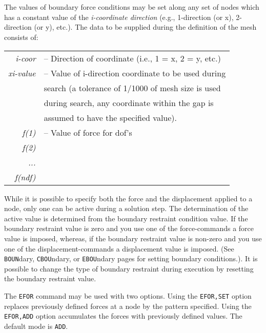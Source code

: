  \\{\smallskip}
 \\{\smallskip}
\headb

The values of boundary force conditions may be set
along any set of nodes which has a constant value of the
{\it i-coordinate direction} (e.g., 1-direction (or x), 2-direction
(or y), etc.).  The data to be supplied during the
definition of the mesh consists of:

\begin{center}
\begin{tabular}{r l}
\it i-coor   &-- Direction of coordinate (i.e., 1 = x, 2 = y, etc.) \\
\it xi-value &-- Value of i-direction coordinate to be used during  \\
             &\quad search (a tolerance of 1/1000 of mesh size is used  \\
             &\quad during search, any coordinate within the gap is  \\
             &\quad assumed to have the specified value).  \\
\it f(1)     &-- Value of force for dof's   \\
\it f(2)     &   \\
\it ...      &   \\
\it f(ndf)   &   \\
\end{tabular}
\end{center}
While it is possible to specify both the force and the displacement applied
to a node, only one can be active during a solution step.  The determination
of the active value is determined from the boundary
restraint condition value.  If the boundary restraint value is zero
and you use one of the force-commands a force
value is imposed, whereas, if the boundary restraint value is non-zero
and you use one of the displacement-commands a
displacement value is imposed. (See {\tt BOUN}dary, {\tt CBOU}ndary,
or {\tt EBOU}ndary pages for setting boundary
conditions.).  It is possible to change the type of boundary restraint
during execution by resetting the boundary restraint value.

The {\tt EFOR} command may be used with two options.  Using the {\tt EFOR,SET}
option replaces previously defined forces at a node by the
pattern specified.  Using the {\tt EFOR,ADD} option
accumulates the forces with previously defined values.
The default mode is {\tt ADD}.

